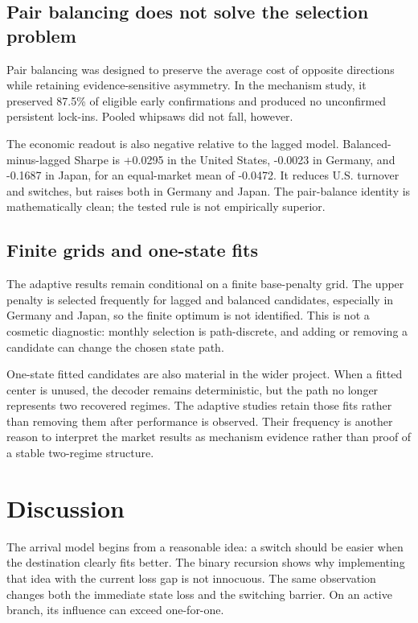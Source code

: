 \documentclass[11pt]{article}
\begin{document}
\subsection{Pair balancing does not solve the selection problem}

Pair balancing was designed to preserve the average cost of opposite directions while retaining evidence-sensitive asymmetry. In the mechanism study, it preserved 87.5\% of eligible early confirmations and produced no unconfirmed persistent lock-ins. Pooled whipsaws did not fall, however.

The economic readout is also negative relative to the lagged model. Balanced-minus-lagged Sharpe is +0.0295 in the United States, -0.0023 in Germany, and -0.1687 in Japan, for an equal-market mean of -0.0472. It reduces U.S. turnover and switches, but raises both in Germany and Japan. The pair-balance identity is mathematically clean; the tested rule is not empirically superior.

\subsection{Finite grids and one-state fits}

The adaptive results remain conditional on a finite base-penalty grid. The upper penalty is selected frequently for lagged and balanced candidates, especially in Germany and Japan, so the finite optimum is not identified. This is not a cosmetic diagnostic: monthly selection is path-discrete, and adding or removing a candidate can change the chosen state path.

One-state fitted candidates are also material in the wider project. When a fitted center is unused, the decoder remains deterministic, but the path no longer represents two recovered regimes. The adaptive studies retain those fits rather than removing them after performance is observed. Their frequency is another reason to interpret the market results as mechanism evidence rather than proof of a stable two-regime structure.

\section{Discussion}

The arrival model begins from a reasonable idea: a switch should be easier when the destination clearly fits better. The binary recursion shows why implementing that idea with the current loss gap is not innocuous. The same observation changes both the immediate state loss and the switching barrier. On an active branch, its influence can exceed one-for-one.
\end{document}
